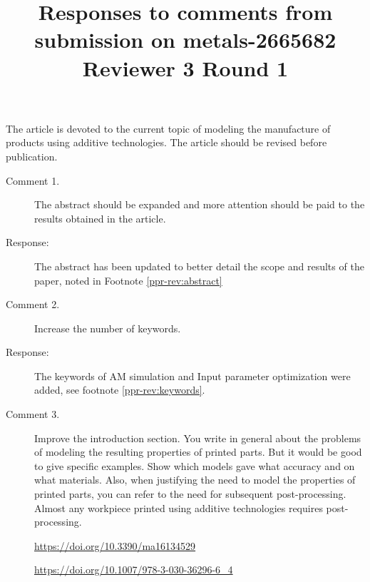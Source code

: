\documentclass{article}
\begin{document}
\title{Responses to comments from submission on metals-2665682\\Reviewer 3 Round 1}
\date{}

\maketitle

The article is devoted to the current topic of modeling the manufacture of products using additive technologies. The article should be revised before publication.
\begin{description}
	\item[Comment 1.] The abstract should be expanded and more attention should be paid to the results obtained in the article.
 	\item[Response:]  The abstract has been updated to better detail the scope and results of the paper, noted in Footnote \ref{ppr-rev:abstract}
	\item[Comment 2.] Increase the number of keywords.
 	\item[Response:] The keywords of \Acf{AM} simulation and Input parameter optimization were added, see footnote \ref{ppr-rev:keywords}.
	\item[Comment 3.] Improve the introduction section. You write in general about the problems of modeling the resulting properties of printed parts. But it would be good to give specific examples. Show which models gave what accuracy and on what materials. Also, when justifying the need to model the properties of printed parts, you can refer to the need for subsequent post-processing. Almost any workpiece printed using additive technologies requires post-processing.

	\url{https://doi.org/10.3390/ma16134529}
	
	\url{https://doi.org/10.1007/978-3-030-36296-6_4}
	

\end{description}
\end{document}
